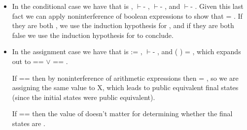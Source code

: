 \documentclass[12pt]{report}
\begin{document}
\begin{itemize}
\item  In the conditional case we have that  is      ,
       \ensuremath{\vdash}- ,  \ensuremath{\vdash}- , and  \ensuremath{\vdash}-   . Given this
      last fact we can apply noninterference of boolean expressions to
      show that    =   . If they are both ,
      we use the induction hypothesis for , and if they are both
      false we use the induction hypothesis for  to conclude.



\item  In the assignment case we have that  is  := ,
       \ensuremath{\vdash}-   , and   ( ) = , which expands out
      to  ==  \ensuremath{\lor}   == .


      If  ==  then by noninterference of arithmetic
      expressions then    =   , so we are
      assigning the same value to X, which leads to public equivalent
      final states (since the initial states were public equivalent).


      If   ==  then the value of  doesn't matter
      for determining whether the final states are . 

\end{itemize}
\begin{coqdoccode}
\coqdocemptyline
\end{coqdoccode}
\end{document}
